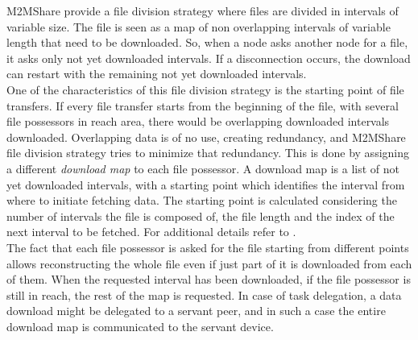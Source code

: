 M2MShare provide a file division strategy where files are divided in intervals of variable size. The file is seen as a map of non overlapping intervals of variable length that need to be downloaded. So, when a node asks another node for a file, it asks only not yet downloaded intervals. If a disconnection occurs, the download can restart with the remaining not yet downloaded intervals.
\\

One of the characteristics of this file division strategy is the starting point of file transfers. If every file transfer starts from the beginning of the file, with several file possessors in reach area, there would be overlapping downloaded intervals downloaded. Overlapping data is of no use, creating redundancy, and M2MShare file division strategy tries to minimize that redundancy. This is done by assigning a different \textit{download map} to each file possessor. A download map is a list of not yet downloaded intervals, with a starting point which identifies the interval from where to initiate fetching data. The starting point is calculated considering the number of intervals the file is composed of, the file length and the index of the next interval to be fetched. For additional details refer to \cite{tesiarmir}.
\\

The fact that each file possessor is asked for the file starting from different points allows reconstructing the whole file even if just part of it is downloaded from each of them. When the requested interval has been downloaded, if the file possessor is still in reach, the rest of the map is requested. In case of task delegation, a data download might be delegated to a servant peer, and in such a case the entire download map is communicated to the servant device.
 
 

